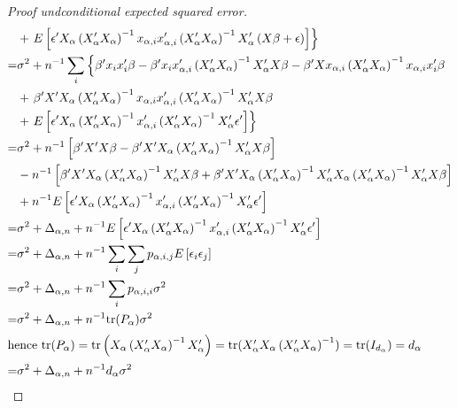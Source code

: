 \documentclass[Research_Module_ES.tex]{subfiles}
\begin{document}
\begin{proof}[Proof undconditional expected squared error]
\begin{align*}
&+\left. E\left[\epsilon^\prime X_\alpha \left(X_\alpha^\prime X_\alpha\right)^{-1}x_{\alpha,i}x_{\alpha,i}^\prime \left(X_\alpha^\prime X_\alpha\right)^{-1} X_\alpha^\prime \left(X\beta +\epsilon\right) \right] \right\}\\
=&\sigma^2 + n^{-1}\sum_i\left\{\beta^\prime x_ix_i^\prime\beta- \beta^\prime x_i x_{\alpha,i}^\prime \left(X_\alpha^\prime X_\alpha\right)^{-1} X_\alpha^\prime X\beta -\beta^\prime X x_{\alpha,i} \left(X_\alpha^\prime X_\alpha\right)^{-1}x_{\alpha,i}x_i^\prime \beta \right.\\
&+\left.\beta^\prime X^\prime X_\alpha \left(X_\alpha^\prime X_\alpha\right)^{-1} x_{\alpha,i}x_{\alpha,i}^\prime \left(X_\alpha^\prime X_\alpha\right)^{-1} X_\alpha^\prime X\beta \right.\\ &+\left. E\left[\epsilon^\prime X_\alpha \left(X_\alpha^\prime X_\alpha\right)^{-1} x_{\alpha,i}^\prime \left(X_\alpha^\prime X_\alpha\right)^{-1} X_\alpha^\prime \epsilon^\prime \right]\right\}\\
=&\sigma^2+ n^{-1}\left[\beta^\prime X^\prime X\beta-\beta^\prime X^\prime X_\alpha \left(X_\alpha^\prime X_\alpha\right)^{-1} X_\alpha^\prime X\beta \right]\\
&-n^{-1}\left[\beta^\prime X^\prime X_\alpha \left(X_\alpha^\prime X_\alpha\right)^{-1} X_\alpha^\prime X\beta +\beta^\prime X^\prime X_\alpha \left(X_\alpha^\prime X_\alpha\right)^{-1} X_\alpha^\prime X_\alpha \left(X_\alpha^\prime X_\alpha\right)^{-1} X_\alpha^\prime X\beta\right]\\
&+n^{-1}E\left[\epsilon^\prime X_\alpha \left(X_\alpha^\prime X_\alpha\right)^{-1} x_{\alpha,i}^\prime \left(X_\alpha^\prime X_\alpha\right)^{-1} X_\alpha^\prime \epsilon^\prime \right]\\
=&\sigma^2+\Delta_{\alpha,n}+n^{-1}E\left[\epsilon^\prime X_\alpha \left(X_\alpha^\prime X_\alpha\right)^{-1} x_{\alpha,i}^\prime \left(X_\alpha^\prime X_\alpha\right)^{-1} X_\alpha^\prime \epsilon^\prime \right]\\
=&\sigma^2+\Delta_{\alpha,n} + n^{-1}\sum_i\sum_j p_{\alpha,i,j}E\left[\epsilon_i\epsilon_j\right]\\
=&\sigma^2+\Delta_{\alpha,n} + n^{-1}\sum_i p_{\alpha,i,i}\sigma^2\\
=&\sigma^2+\Delta_{\alpha,n} + n^{-1}\text{tr}(P_\alpha)\sigma^2\\
\intertext{hence $\text{tr}(P_\alpha)=\text{tr}\left(X_\alpha \left(X_\alpha^\prime X_\alpha\right)^{-1} X_\alpha^\prime\right)=\text{tr}(X_\alpha^\prime X_\alpha \left(X_\alpha^\prime X_\alpha\right)^{-1})=\text{tr}(I_{d_\alpha})=d_\alpha $}
=&\sigma^2+\Delta_{\alpha,n} + n^{-1}d_\alpha\sigma^2
\end{align*}



\end{proof}
\end{document}
